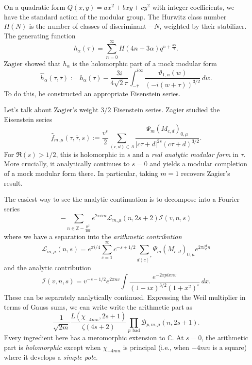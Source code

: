 \documentclass[reqno]{amsart} 
\numberwithin{theorem}{section}
\numberwithin{equation}{section}
\begin{document}
On a quadratic form $Q(x, y) = a x^2 + b x y + c y^2$ with integer coefficients, we have the standard action of the modular group.  The Hurwitz class number $H(N)$ is the number of classes of discriminant $-N$, weighted by their stabilizer.  The generating function
\begin{equation*}
  h_\alpha(\tau) = \sum_{n = 0}^\infty H(4 n + 3 \alpha) q^{n + \frac{3 \alpha}{4}}.
\end{equation*}
Zagier showed that $h_\alpha$ is the holomorphic part of a mock modular form
\begin{equation*}
  \hat{h}_\alpha(\tau, \bar{\tau}) := h_\alpha(\tau) - \frac{3 i}{ 4 \sqrt{2} \pi}
  \int_{- \bar{\tau}}^{i \infty}
  \frac{\vartheta_{1, \alpha}(w)}{(- i(w + \tau))^{3/2}} \, d w.
\end{equation*}
To do this, he constructed an appropriate Eisenstein series.

Let's talk about Zagier's weight $3/2$ Eisenstein series.  Zagier studied the Eisenstein series
\begin{equation*}
  \hat{f}_{m, \mu}(\tau, \bar{\tau}, s) := \frac{v^s}{2}
  \sum_{(c, d) \in \Lambda}
  \frac{\Psi_m(M_{c, d})_{0, \mu}}{ \lvert c \tau + d \rvert^{2 s}(c \tau + d)^{3/2}}.
\end{equation*}
For $\Re(s) > 1/2$, this is holomorphic in $s$ and a \emph{real analytic modular form} in $\tau$.  More crucially, it analytically continues to  $s = 0$ and yields a modular completion of a mock modular form there.  In particular, taking $m = 1$ recovers Zagier's result.

The easiest way to see the analytic continuation is to decompose into a Fourier series
\begin{equation*}
  - \sum_{n \in \mathbb{Z} - \frac{\mu^2}{4 m}}
  e^{2 \pi i \tau n}
  \mathcal{L}_{m, \mu}(n, 2 s + 2)
  \mathcal{I}(v, n, s)
\end{equation*}
where we have a separation into the \emph{arithmetic contribution}
\begin{equation*}
  \mathcal{L}_{m, \mu}(n, s) = e^{\pi i /4} \sum_{c = 1}^\infty c^{- s + 1/2} \sum_{d(c)^\ast}
  \Psi_m(M_{c, d})_{0, \mu} e^{2 \pi i \tfrac{d}{c}n}
\end{equation*}
and the analytic contribution
\begin{equation*}
  \mathcal{I}(v, n, s) = v^{- s - 1/2} e^{2 \pi n v} \int \frac{e^{- 2 x pi x n v}}{(1 - i x)^{3/2}(1 + x^2)^s} \, d x.
\end{equation*}
These can be separately analytically continued.  Expressing the Weil multiplier in terms of Gauss sums, we can write write the arithmetic part as
\begin{equation*}
  \frac{1}{\sqrt{2 m}}
  \frac{L(\chi_{- 4 m n}, 2 s + 1)}{ \zeta(4 s + 2)}
  \prod_{p : \text{bad}}
  \mathcal{B}_{p, m, \mu}(n, 2 s + 1).
\end{equation*}
Every ingredient here has a meromorphic extension to $\mathbb{C}$.  At $s = 0$, the arithmetic part is \emph{holomorphic} except when $\chi_{- 4 m n}$ is principal (i.e., when $- 4 m n$ is a square) where it develops a \emph{simple pole}.
\end{document}
